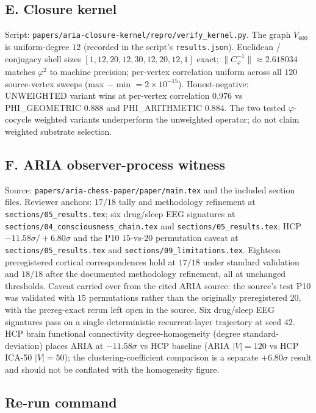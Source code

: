 \documentclass[11pt]{article}
\theoremstyle{definition}
\newcommand{\pphi}{\varphi}
\newcommand{\Vsub}{V_{600}}
\newcommand{\Cphi}{C_{\pphi}}
\begin{document}
\subsection*{E. Closure kernel}\label{app:fsa-E}
Script: \texttt{papers/aria-closure-kernel/repro/verify\_kernel.py}.
The graph $\Vsub$ is uniform-degree $12$ (recorded in the script's
\texttt{results.json}). Euclidean / conjugacy shell sizes
$[1, 12, 20, 12, 30, 12, 20, 12, 1]$ exact;
$\|\Cphi^{-1}\| \approx 2.618034$ matches $\pphi^2$ to machine precision;
per-vertex correlation uniform across all $120$ source-vertex sweeps (max $-$ min $= 2 \times
10^{-15}$). Honest-negative: UNWEIGHTED variant wins at per-vertex
correlation $0.976$ vs PHI\_GEOMETRIC $0.888$ and PHI\_ARITHMETIC
$0.884$. The two tested $\pphi$-cocycle weighted variants underperform the unweighted operator; do not claim weighted
substrate selection.

\subsection*{F. ARIA observer-process witness}\label{app:fsa-F}
Source: \texttt{papers/aria-chess-paper/paper/main.tex} and the
included section files. Reviewer anchors: $17/18$ tally and
methodology refinement at
\texttt{sections/05\_results.tex}; six drug/sleep EEG signatures at
\texttt{sections/04\_consciousness\_chain.tex} and
\texttt{sections/05\_results.tex}; HCP $-11.58\sigma/+6.80\sigma$ and
the P10 $15$-vs-$20$ permutation caveat at
\texttt{sections/05\_results.tex} and
\texttt{sections/09\_limitations.tex}. Eighteen
preregistered cortical correspondences hold at $17/18$ under standard
validation and $18/18$ after the documented methodology refinement,
all at unchanged thresholds. Caveat carried over from the cited
ARIA source: the source's test P10 was validated with $15$
permutations rather than the originally preregistered $20$, with
the prereg-exact rerun left open in the source.
Six drug/sleep EEG signatures pass on a single deterministic
recurrent-layer trajectory at seed $42$. HCP brain functional
connectivity degree-homogeneity (degree standard-deviation) places
ARIA at $-11.58\sigma$ vs HCP baseline (ARIA $|V| = 120$ vs HCP ICA-50
$|V| = 50$); the clustering-coefficient comparison is a separate
$+6.80\sigma$ result and should not be conflated with the homogeneity
figure.

\subsection*{Re-run command}
\end{document}
